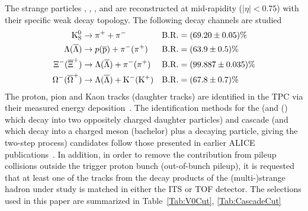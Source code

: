 The strange particles \kzero, \lmb, \almb, \Xis and \Oms are reconstructed at mid-rapidity ($|\eta| < 0.75$) with their specific weak decay topology. The following decay channels are studied~\cite{PhysRevD.98.030001}
$$
\begin{aligned}
	{\rm K}^{0}_{\rm{S}}       &\to \pi^{+} + \pi^{-}                 &\mathrm{B.R.} &= (69.20 \pm 0.05) \%  \\
	\Lambda (\overline{\Lambda}) &\to p(\rm\overline{p}) + \pi^{-} (\pi^{+})      &\mathrm{B.R.} &= (63.9 \pm 0.5) \% \\
	\Xi^- (\overline{\Xi}^+)     &\to \Lambda (\overline{\Lambda}) + \pi^{-} (\pi^{+})  &\mathrm{B.R.} &= (99.887 \pm 0.035) \% \\
	\Omega^- (\overline{\Omega}^+)    &\to \Lambda (\overline{\Lambda}) + \rm{K}^{-} (\rm{K}^{+})  &\mathrm{B.R.} &= (67.8 \pm 0.7) \% \\
\end{aligned}
$$	
The proton, pion and Kaon tracks (daughter tracks) are identified in the TPC via their measured energy deposition~\cite{Abelev:2014ffa}. 
The identification methods for the  \Vzero (\kzero and \lmb (\almb) which decay into two oppositely charged daughter particles) and cascade (\Xis and \Oms which decay into a charged meson (bachelor) plus a \Vzero decaying particle, giving the two-step process) candidates follow those presented in earlier ALICE publications~\cite{Aamodt:2011zza, Abelev:2012jp, Acharya:2018orn, Abelev:2013haa, Acharya:2020uxl, Acharya:2019kyh}. In addition, in order to remove the contribution from pileup collisions outside the trigger proton bunch (out-of-bunch pileup), it is requested that at least one of the tracks from the decay products of the (multi-)strange hadron under study is matched in either the ITS or TOF detector. The selections used in this paper are summarized in Table~\ref{Tab:V0Cut}, \ref{Tab:CascadeCut}
